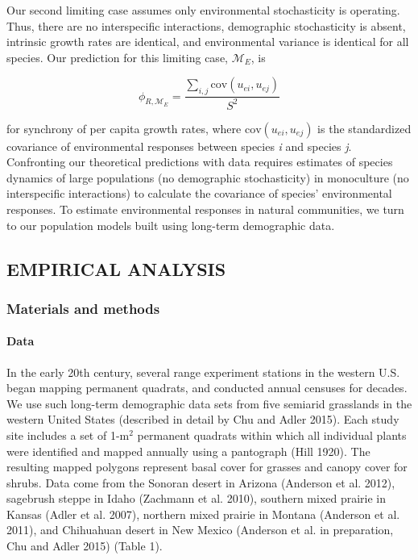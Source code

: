 \documentclass[12pt,]{article}
\begin{document}
Our second limiting case assumes only environmental stochasticity is
operating. Thus, there are no interspecific interactions, demographic
stochasticity is absent, intrinsic growth rates are identical, and
environmental variance is identical for all species. Our prediction for
this limiting case, \(\mathcal{M}_{E}\), is

\begin{equation}
\phi_{R,\mathcal{M}_{E}} = \frac{\sum_{i,j}\text{cov}(u_{ei},u_{ej})}{S^2}
\end{equation}

\noindent{} for synchrony of per capita growth rates, where
\(\text{cov}(u_{ei},u_{ej})\) is the standardized covariance of
environmental responses between species \emph{i} and species \emph{j}.
Confronting our theoretical predictions with data requires estimates of
species dynamics of large populations (no demographic stochasticity) in
monoculture (no interspecific interactions) to calculate the covariance
of species' environmental responses. To estimate environmental responses
in natural communities, we turn to our population models built using
long-term demographic data.

\subsection{EMPIRICAL ANALYSIS}\label{empirical-analysis}

\subsubsection{Materials and methods}\label{materials-and-methods}

\paragraph{Data}\label{data}

In the early 20th century, several range experiment stations in the
western U.S. began mapping permanent quadrats, and conducted annual
censuses for decades. We use such long-term demographic data sets from
five semiarid grasslands in the western United States (described in
detail by Chu and Adler 2015). Each study site includes a set of
1-\(\text{m}^2\) permanent quadrats within which all individual plants
were identified and mapped annually using a pantograph (Hill 1920). The
resulting mapped polygons represent basal cover for grasses and canopy
cover for shrubs. Data come from the Sonoran desert in Arizona (Anderson
et al. 2012), sagebrush steppe in Idaho (Zachmann et al. 2010), southern
mixed prairie in Kansas (Adler et al. 2007), northern mixed prairie in
Montana (Anderson et al. 2011), and Chihuahuan desert in New Mexico
(Anderson et al. in preparation, Chu and Adler 2015) (Table 1).
\end{document}
